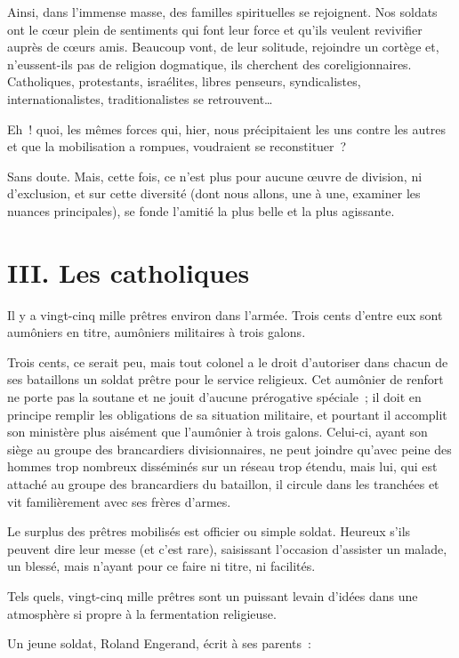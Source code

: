 \documentclass[french,twoside]{book} %
\newcommand\chapteropen{} %
\newcommand\chaptercont{} %
\newcommand\chapterclose{} %
\begin{document}
Ainsi, dans l’immense masse, des familles spirituelles se rejoignent. Nos soldats ont le cœur plein de sentiments qui font leur force et qu’ils veulent revivifier auprès de cœurs amis. Beaucoup vont, de leur solitude, rejoindre un cortège et, n’eussent-ils pas de religion dogmatique, ils cherchent des coreligionnaires. Catholiques, protestants, israélites, libres penseurs, syndicalistes, internationalistes, traditionalistes se retrouvent…‌\par
Eh ! quoi, les mêmes forces qui, hier, nous précipitaient les uns contre les autres et que la mobilisation a rompues, voudraient se reconstituer ?‌\par
Sans doute. Mais, cette fois, ce n’est plus pour aucune œuvre de division, ni d’exclusion, et sur cette diversité (dont nous allons, une à une, examiner les nuances principales), se fonde l’amitié la plus belle et la plus agissante.‌
\chapterclose


\chapteropen
\chapter[III. Les catholiques]{III. Les catholiques}\renewcommand{\leftmark}{III. Les catholiques}


\chaptercont
\noindent Il y a vingt-cinq mille prêtres environ dans l’armée. Trois cents d’entre eux sont aumôniers en titre, aumôniers militaires à trois galons.‌\par
Trois cents, ce serait peu, mais tout colonel a le droit d’autoriser dans chacun de ses bataillons un soldat prêtre pour le service religieux. Cet aumônier de renfort ne porte pas la soutane et ne jouit d’aucune prérogative spéciale ; il doit en principe remplir les obligations de sa situation militaire, et pourtant il accomplit son ministère plus aisément que l’aumônier à trois galons. Celui-ci, ayant son siège au groupe des brancardiers divisionnaires, ne peut joindre qu’avec peine des hommes trop nombreux disséminés sur un réseau trop étendu, mais lui, qui est attaché au groupe des brancardiers du bataillon, il circule dans les tranchées et vit familièrement avec ses frères d’armes.‌\par
Le surplus des prêtres mobilisés est officier ou simple soldat. Heureux s’ils peuvent dire leur messe (et c’est rare), saisissant l’occasion d’assister un malade, un blessé, mais n’ayant pour ce faire ni titre, ni facilités.‌\par
Tels quels, vingt-cinq mille prêtres sont un puissant levain d’idées dans une atmosphère si propre à la fermentation religieuse.‌\par
Un jeune soldat, Roland Engerand, écrit à ses parents :\par
\end{document}
